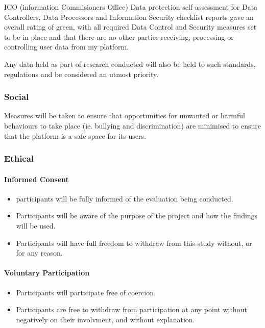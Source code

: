 \documentclass[lettersize,journal]{IEEEtran}
\begin{document}
	ICO (information Commisioners Office) \cite{ICO} Data protection self assessment for Data Controllers, Data Processors and Information Security
	checklist reports gave an overall rating of green, with all required Data Control and Security measures set to be in place and that
	there are no other parties receiving, processing or controlling user data from my platform.

	Any data held as part of research conducted will also be held to such standards, regulations and be considered an utmost priority.
	
	\subsubsection{Social}
		Measures will be taken to ensure that opportunities for unwanted or harmful behaviours to take place (ie. bullying and discrimination) 
		are minimised to ensure that the platform is a safe space for its users.

	\subsubsection{Ethical}

		\paragraph{Informed Consent}

		\begin{itemize}
			\item participants will be fully informed of the evaluation being conducted.
			\item Participants will be aware of the purpose of the project and how the findings will be used.
			\item Participants will have full freedom to withdraw from this study without, or for any reason.
		\end{itemize}

		\paragraph{Voluntary Participation}
		\begin{itemize}
			\item Participants will participate free of coercion.
			\item Participants are free to withdraw from participation at any point without negatively on their involvment, and without explanation.
		\end{itemize}
\end{document}
